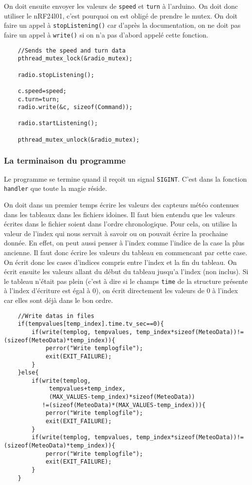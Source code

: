 On doit ensuite envoyer les valeurs de \texttt{speed} et \texttt{turn} à
l'arduino. On doit donc utiliser le nRF24l01, c'est pourquoi on est obligé de
prendre le mutex. On doit faire un appel à \texttt{stopListening()} car d'après
la documentation, on ne doit pas faire un appel à \texttt{write()} si on n'a pas
d'abord appelé cette fonction. \\
 
\begin{DDbox}{\linewidth}
\begin{lstlisting}
	//Sends the speed and turn data
	pthread_mutex_lock(&radio_mutex);

	radio.stopListening();

	c.speed=speed;
	c.turn=turn;
	radio.write(&c, sizeof(Command));

	radio.startListening();

	pthread_mutex_unlock(&radio_mutex);
\end{lstlisting}
\end{DDbox}

\subsubsection{La terminaison du programme}

Le programme se termine quand il reçoit un signal \texttt{SIGINT}. C'est dans
la fonction \texttt{handler} que toute la magie réside. 

On doit dans un premier temps écrire les valeurs des capteurs météo contenues 
dans les tableaux dans les fichiers idoines. Il faut bien entendu que les 
valeurs écrites dans le fichier soient dans l'ordre chronologique. Pour cela,
on utilise la valeur de l'index qui nous servait à savoir ou on pouvait écrire
la prochaine donnée. En effet, on peut aussi penser à l'index comme l'indice de 
la case la plus ancienne. Il faut donc écrire les valeurs du tableau en 
commencant par cette case. On écrit donc les cases d'indices compris entre 
l'index et la fin du tableau. On écrit ensuite les valeurs allant du début
du tableau jusqu'a l'index (non inclus). Si le tableau n'était pas plein (c'est
à dire si le champs \texttt{time} de la structure présente à l'index d'écriture
est égal à 0), on écrit directement les valeurs de 0 à l'index car elles sont 
déjà dans le bon ordre. \\

\begin{DDbox}{\linewidth}
\begin{lstlisting}
	//Write datas in files
	if(tempvalues[temp_index].time.tv_sec==0){
		if(write(templog, tempvalues, temp_index*sizeof(MeteoData))!=(sizeof(MeteoData)*temp_index)){
			perror("Write templogfile");
			exit(EXIT_FAILURE);
		}
	}else{
		if(write(templog,
			 tempvalues+temp_index, 
			 (MAX_VALUES-temp_index)*sizeof(MeteoData))
		   !=(sizeof(MeteoData)*(MAX_VALUES-temp_index))){
			perror("Write templogfile");
			exit(EXIT_FAILURE);
		}
		if(write(templog, tempvalues, temp_index*sizeof(MeteoData))!=(sizeof(MeteoData)*temp_index)){
			perror("Write templogfile");
			exit(EXIT_FAILURE);
		}
	}
\end{lstlisting}
\end{DDbox}

